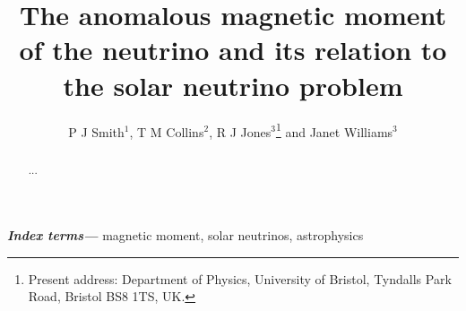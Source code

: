 \documentclass[12pt]{iopart}
\providecommand{\keywords}[1]{\textbf{\textit{Index terms---}} #1}
\begin{document}
\title[The anomalous magnetic moment of the neutrino]{The anomalous magnetic moment of the neutrino and its relation to the solar neutrino problem}

\author{P J Smith$^1$, T M Collins$^2$, R J Jones$^3$\footnote{Present address: Department of Physics, University of Bristol, Tyndalls Park Road, Bristol BS8 1TS, UK.} and Janet Williams$^3$}

\address{$^1$ Mathematics Faculty, Open University, Milton Keynes MK7~6AA, UK}
\address{$^2$ Department of Mathematics, Imperial College, Prince Consort Road, London SW7~2BZ, UK}
\address{$^3$ Department of Computer Science, University College London, Gower Street, London WC1E~6BT, UK}

\begin{abstract}
...
\end{abstract}

\keywords{magnetic moment, solar neutrinos, astrophysics}
\submitto{\jpg}
\maketitle

\end{document}
